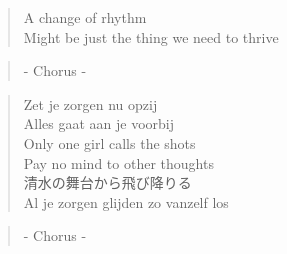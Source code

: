 \begin{minipage}{0.55\textwidth}

\begin{verse}
A change of rhythm \\
Might be just the thing we need to thrive  
\end{verse}

\begin{verse}
- Chorus - 
\end{verse}

\begin{verse}
Zet je zorgen nu opzij \\
Alles gaat aan je voorbij \\
Only one girl calls the shots \\
Pay no mind to other thoughts \\
清水の舞台から飛び降りる\\
Al je zorgen glijden zo vanzelf los 
\end{verse}

\begin{verse}
- Chorus - 
\end{verse}
\end{minipage}

\clearpage
